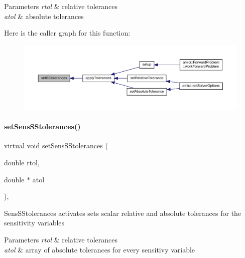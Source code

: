 \begin{DoxyParams}{Parameters}
{\em rtol} & relative tolerances \\
\hline
{\em atol} & absolute tolerances \\
\hline
\end{DoxyParams}
Here is the caller graph for this function\+:
\nopagebreak
\begin{figure}[H]
\begin{center}
\leavevmode
\includegraphics[width=350pt]{classamici_1_1_solver_a6a688afa51ec71eded6c8801faaafac3_icgraph}
\end{center}
\end{figure}
\mbox{\label{classamici_1_1_solver_a16ec3b994dd433e71fcb58eea3cd529f}} 
\paragraph{\texorpdfstring{set\+Sens\+S\+Stolerances()}{setSensSStolerances()}}
{\footnotesize\ttfamily virtual void set\+Sens\+S\+Stolerances (\begin{DoxyParamCaption}\item[{double}]{rtol,  }\item[{double $\ast$}]{atol }\end{DoxyParamCaption})\hspace{0.3cm}{\ttfamily [protected]}, {}}

Sens\+S\+Stolerances activates sets scalar relative and absolute tolerances for the sensitivity variables


\begin{DoxyParams}{Parameters}
{\em rtol} & relative tolerances \\
\hline
{\em atol} & array of absolute tolerances for every sensitivy variable \\
\hline
\end{DoxyParams}
\mbox{\label{classamici_1_1_solver_a1928530b3110cb9229d6836c5389379f}} 
